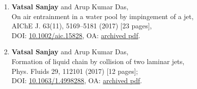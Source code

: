 \documentclass[10pt,a4paper,colorlinks,linkcolor=blue,urlcolor=blue,citecolor=blue]{moderncv}
\begin{document}
\begin{enumerate}[leftmargin=1.25em]
	\item \textbf{Vatsal Sanjay} and Arup Kumar Das,\\
	On air entrainment in a water pool by impingement of a jet,\\
	AIChE J. 63(11), 5169--5181  (2017) [23 pages],\\
	DOI: \href{https://doi.org/10.1002/aic.15828}{10.1002/aic.15828}, OA: \href{https://tinyurl.com/24ne4oql}{archived pdf}.

	\item \textbf{Vatsal Sanjay} and Arup Kumar Das,\\
	Formation of liquid chain by collision of two laminar jets,\\
	Phys. Fluids 29, 112101  (2017) [12 pages];\\
	DOI: \href{https://doi.org/10.1063/1.4998288}{10.1063/1.4998288}, OA: \href{https://tinyurl.com/27sd7lgo}{archived pdf}.

\end{enumerate}

\end{document}
